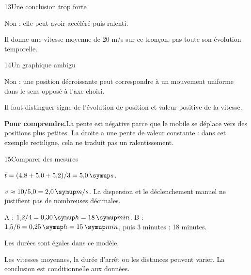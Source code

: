\par\noindent\begin{minipage}{\linewidth}
\begin{corrige}{13}{Une conclusion trop forte}
\begin{questions}
\item Non : elle peut avoir accéléré puis ralenti.
\item Il donne une vitesse moyenne de 20 m/s sur ce tronçon, pas toute son évolution temporelle.
\end{questions}
\end{corrige}
\end{minipage}
\par\noindent\begin{minipage}{\linewidth}
\begin{corrige}{14}{Un graphique ambigu}
\begin{questions}
\item Non : une position décroissante peut correspondre à un mouvement uniforme dans le sens opposé à l’axe choisi.
\item Il faut distinguer signe de l’évolution de position et valeur positive de la vitesse.
\end{questions}
\par\smallskip\noindent\textbf{Pour comprendre.}\enspace La pente est négative parce que le mobile se déplace vers des positions plus petites. La droite a une pente de valeur constante : dans cet exemple rectiligne, cela ne traduit pas un ralentissement.\par
{}
\end{corrige}
\end{minipage}
\par\noindent\begin{minipage}{\linewidth}
\begin{corrige}{15}{Comparer des mesures}
\begin{questions}
\item $\bar t=(4{,}8+5{,}0+5{,}2)/3=5{,}0\unite s$.
\item $v\approx10/5{,}0=2{,}0\unite{m/s}$. La dispersion et le déclenchement manuel ne justifient pas de nombreuses décimales.
\end{questions}
\end{corrige}
\end{minipage}
\par\noindent\begin{minipage}{\linewidth}
\label{cor-defi-9}\begin{questions}
\item A : $1{,}2/4=0{,}30\unite h=18\unite{min}$. B : $1{,}5/6=0{,}25\unite h=15\unite{min}$, puis 3 minutes : 18 minutes.
\item Les durées sont égales dans ce modèle.
\item Les vitesses moyennes, la durée d’arrêt ou les distances peuvent varier. La conclusion est conditionnelle aux données.
\end{questions}
\end{minipage}
